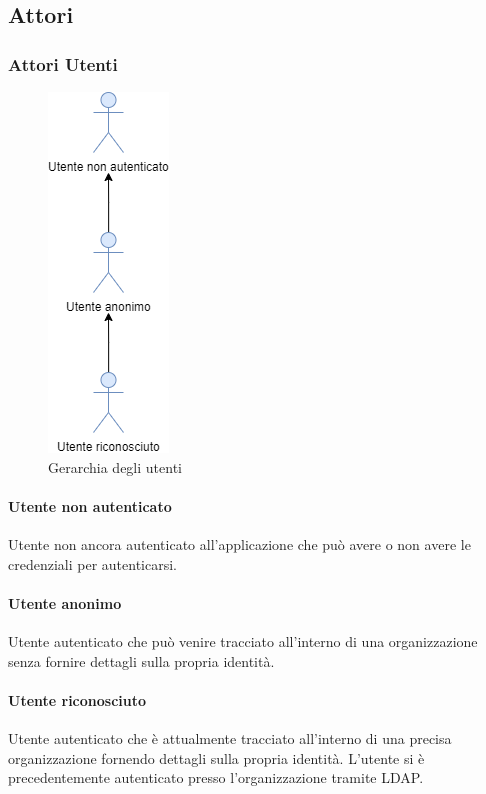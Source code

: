 \subsection{Attori}
\subsubsection{Attori Utenti}

\begin{figure}[h]
  \caption{Gerarchia degli utenti}
  \centering
    \includegraphics[scale=0.6]{Sezioni/UseCase/Immagini/Utenti.png}
\end{figure}

\paragraph{Utente non autenticato}
Utente non ancora autenticato all'applicazione che può avere o non avere le credenziali per autenticarsi.
\paragraph{Utente anonimo}
Utente autenticato che può venire tracciato all'interno di una organizzazione senza fornire dettagli sulla propria identità.
\paragraph{Utente riconosciuto}
Utente autenticato che è attualmente tracciato all'interno di una precisa organizzazione fornendo dettagli sulla propria identità.
L'utente si è precedentemente autenticato presso l'organizzazione tramite LDAP.



